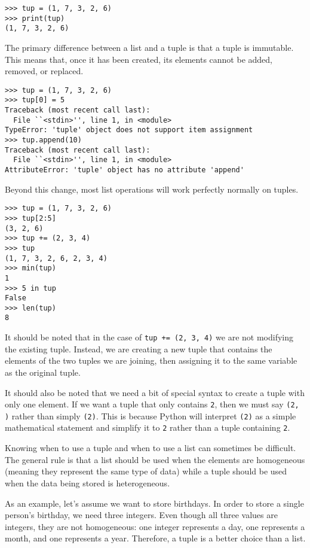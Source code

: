 \documentclass[11pt]{cselabheader}
\begin{document}
\begin{lstlisting}[style=ipython]
>>> tup = (1, 7, 3, 2, 6)
>>> print(tup)
(1, 7, 3, 2, 6)
\end{lstlisting}

The primary difference between a list and a tuple is that a tuple is immutable. This means that, once it has been created, its elements cannot be added, removed, or replaced.

\begin{lstlisting}[style=ipython]
>>> tup = (1, 7, 3, 2, 6)
>>> tup[0] = 5
Traceback (most recent call last):
  File ``<stdin>'', line 1, in <module>
TypeError: 'tuple' object does not support item assignment
>>> tup.append(10)
Traceback (most recent call last):
  File ``<stdin>'', line 1, in <module>
AttributeError: 'tuple' object has no attribute 'append'
\end{lstlisting}

Beyond this change, most list operations will work perfectly normally on tuples.

\begin{lstlisting}[style=ipython]
>>> tup = (1, 7, 3, 2, 6)
>>> tup[2:5]
(3, 2, 6)
>>> tup += (2, 3, 4)
>>> tup
(1, 7, 3, 2, 6, 2, 3, 4)
>>> min(tup)
1
>>> 5 in tup
False
>>> len(tup)
8
\end{lstlisting}

It should be noted that in the case of \lstinline{tup += (2, 3, 4)} we are not modifying the existing tuple. Instead, we are creating a new tuple that contains the elements of the two tuples we are joining, then assigning it to the same variable as the original tuple.

It should also be noted that we need a bit of special syntax to create a tuple with only one element. If we want a tuple that only contains \lstinline{2}, then we must say \lstinline{(2, )} rather than simply \lstinline{(2)}. This is because Python will interpret \lstinline{(2)} as a simple mathematical statement and simplify it to \lstinline{2} rather than a tuple containing \lstinline{2}.

Knowing when to use a tuple and when to use a list can sometimes be difficult. The general rule is that a list should be used when the elements are homogeneous (meaning they represent the same type of data) while a tuple should be used when the data being stored is heterogeneous.

As an example, let's assume we want to store birthdays. In order to store a single person's birthday, we need three integers. Even though all three values are integers, they are not homogeneous: one integer represents a day, one represents a month, and one represents a year. Therefore, a tuple is a better choice than a list.
\end{document}
